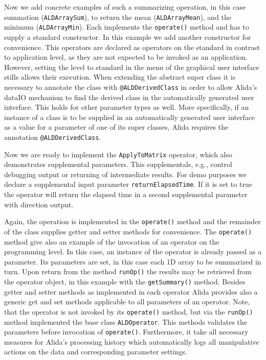 \renewcommand{\codefile}{../../../../../../src/de/unihalle/informatik/Alida/demo/ALDSummarizeArrayOp.java}
\setcounter{off}{54}

Now we add concrete examples of such a summarizing operation, in this case
summation (\lstinline+ALDArraySum+), to return the mean (\lstinline+ALDArrayMean+), and the minimum (\lstinline+ALDArrayMin+).
Each implements the  \lstinline+operate()+ method and has to supply a standard constructor.
In this example we add another constructor for convenience.
This operators are declared as operators on the standard in contrast to 
application level, as they are not expected to be invoked as an application.
However, setting the level to standard in the menu of the graphical user interface
stills allows their execution.
When extending the abstract super class it is necessary to annotate the
class with \lstinline+@ALDDerivedClass+ in order to allow Alida's dataIO mechanism to find the derived class
in the automatically generated user interface.
This holds for other parameter types as well.
More specifically, if an instance of a class is to be supplied in an automatically 
generated user interface as a value for a parameter of one of its super classes,
Alida requires the annotation \lstinline+@ALDDerivedClass+.

\renewcommand{\codefile}{../../../../../../src/de/unihalle/informatik/Alida/demo/ALDArraySum.java}
\setcounter{off}{49}

Now we are ready to implement 
the \lstinline+ApplyToMatrix+ operator, which also demonstrates supplemental parameters.
This supplementals, e.g., control debugging output or returning of intermediate results.
For demo purposes we declare a supplemental input parameter \lstinline+returnElapsedTime+.
If it is set to true the operator will return the elapsed time in a second
supplemental parameter with direction output.

Again, the operation is implemented in the  \lstinline+operate()+ method and the remainder of the
class supplies getter and setter methods for convenience.
The  \lstinline+operate()+ method give also an example of the invocation of an operator on the
programming level.
In this case, an instance of the operator is already passed as a parameter.
Its parameters are set, in this case each 1D array to be summarized in turn.
Upon return from the method \lstinline+runOp()+ the results may be retrieved from the operator object,
in this example with the \lstinline+getSummary()+ method.
Besides getter and setter methods as implemented in each operator
Alida provides also a generic get and set methods applicable to
all parameters of an operator.
Note, that the operator is not invoked by its  \lstinline+operate()+ method, but via
the \lstinline+runOp()+ method implemented the base class \lstinline+ALDOperator+.
This methods validates the parameters before invocation of  \lstinline+operate()+.
Furthermore, it take all necessary measures for Alida's processing
history which automatically logs
all manipulative actions on the data and corresponding parameter settings. 


